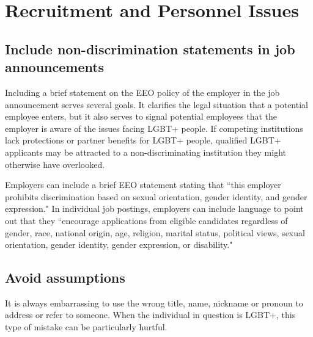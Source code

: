 %

\chapter{Recruitment and Personnel Issues}	%
\label{personnel-issues}		%
\normalsize			%

\section [Include non-discrimination statements in job announcements]{Include non-discrimination statements in job announcements}
\label{nondisc-statement}
Including a brief statement on the EEO policy of the employer in the job announcement serves several goals. It clarifies the legal situation that a potential employee enters, but it also serves to signal potential employees that the employer is aware of the issues facing LGBT+ people. If competing institutions lack protections or partner benefits for LGBT+ people, qualified LGBT+ applicants may be attracted to a non-discriminating institution they might otherwise have overlooked.

Employers can include a brief EEO statement stating that ``this employer prohibits discrimination based on sexual orientation, gender identity, and gender expression." In individual job postings, employers can include language to point out that they ``encourage applications from eligible candidates regardless of gender, race, national origin, age, religion, marital status, political views, sexual orientation, gender identity, gender expression, or disability."

\section {Avoid assumptions}
\label{assumptions}
It is always embarrassing to use the wrong title, name, nickname or pronoun to address or refer to someone. When the individual in question is LGBT+, this type of mistake can be particularly hurtful.

